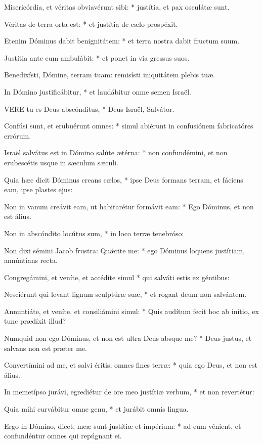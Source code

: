 Misericórdia, et véritas obviavérunt sibi: * justítia, et pax osculátæ sunt.

Véritas de terra orta est: * et justítia de cælo prospéxit.

Etenim Dóminus dabit benignitátem: * et terra nostra dabit fructum suum.

Justítia ante eum ambulábit: * et ponet in via gressus suos.

 Benedixísti, Dómine, terram tuam: remisísti iniquitátem plebis tuæ.

 In Dómino justificábitur, * et laudábitur omne semen Israël.


\lettrine[lines=2]{V}{ERE} tu es Deus abscónditus, * Deus Israël, Salvátor.

Confúsi sunt, et erubuérunt omnes: * simul abiérunt in confusiónem fabricatóres errórum.

Israël salvátus est in Dómino salúte ætérna: * non confundémini, et non erubescétis usque in sæculum sæculi.

Quia hæc dicit Dóminus creans cælos, * ipse Deus formans terram, et fáciens eam, ipse plastes ejus:

Non in vanum creávit eam, ut habitarétur formávit eam: * Ego Dóminus, et non est álius.

Non in abscóndito locútus sum, * in loco terræ tenebróso:

Non dixi sémini Jacob frustra: Quǽrite me: * ego Dóminus loquens justítiam, annúntians recta.

Congregámini, et veníte, et accédite simul * qui salváti estis ex géntibus:

Nesciérunt qui levant lignum sculptúræ suæ, * et rogant deum non salvántem.

Annuntiáte, et veníte, et consiliámini simul: * Quis audítum fecit hoc ab inítio, ex tunc prædíxit illud?

Numquid non ego Dóminus, et non est ultra Deus absque me? * Deus justus, et salvans non est præter me.

Convertímini ad me, et salvi éritis, omnes fines terræ: * quia ego Deus, et non est álius.

In memetípso jurávi, egrediétur de ore meo justítiæ verbum, * et non revertétur:

Quia mihi curvábitur omne genu, * et jurábit omnis lingua.

Ergo in Dómino, dicet, meæ sunt justítiæ et impérium: * ad eum vénient, et confundéntur omnes qui repúgnant ei.

